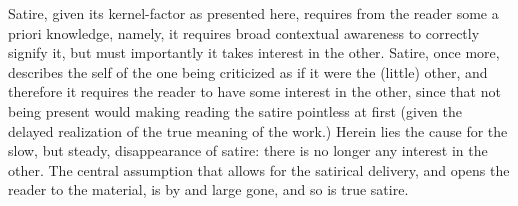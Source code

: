 \documentclass[11pt,letterpaper]{article}
\theoremstyle{definition}
\begin{document}
Satire, given its kernel-factor as presented here, requires from the reader some a priori knowledge, namely, it requires broad contextual awareness to correctly signify it, but must importantly it takes interest in the other. Satire, once more, describes the self of the one being criticized as if it were the (little) other, and therefore it requires the reader to have some interest in the other, since that not being present would making reading the satire pointless at first (given the delayed realization of the true meaning of the work.) Herein lies the cause for the slow, but steady, disappearance of satire: there is no longer any interest in the other. The central assumption that allows for the satirical delivery, and opens the reader to the material, is by and large gone, and so is true satire.

\newpage
\printbibliography[heading=bibintoc,title={Bibliography}]
\end{document}

